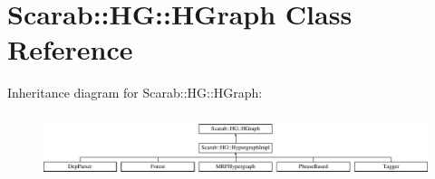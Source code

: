 \hypertarget{classScarab_1_1HG_1_1HGraph}{
\section{Scarab::HG::HGraph Class Reference}
\label{classScarab_1_1HG_1_1HGraph}
}
Inheritance diagram for Scarab::HG::HGraph:\begin{figure}[H]
\begin{center}
\leavevmode
\includegraphics[height=1.85635cm]{classScarab_1_1HG_1_1HGraph}
\end{center}
\end{figure}
